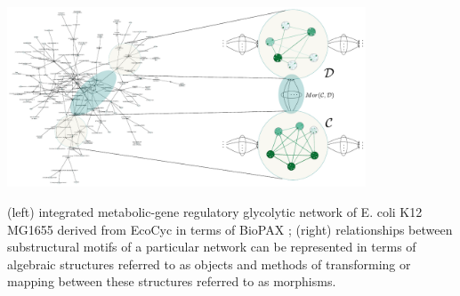 \begin{frame}
\centering\includegraphics[width=0.8\textwidth]{fig/biograph.pdf}

(left) integrated metabolic-gene regulatory glycolytic network of E. coli K12 MG1655 derived from EcoCyc \cite{Keseler2011} in terms of BioPAX \cite{Demir2010}; (right) relationships between substructural motifs of a particular network can be represented in terms of algebraic structures referred to as objects and methods of transforming or mapping between these structures referred to as morphisms.
\end{frame}
